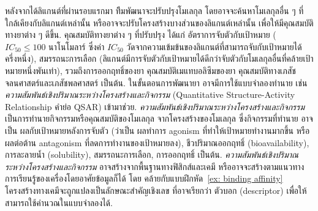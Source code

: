 {\begin{shaded}
หลังจากได้ลิแกนต์ที่ผ่านรอบแรกมา
ทีีมพัฒนาจะปรับปรุงโมเลกุล 
โดยอาจจะค้นหาโมเลกุลอื่น ๆ ที่ใกล้เคียงกับลิแกนต์เหล่านั้น
หรืออาจจะปรับโครงสร้างบางส่วนของลิแกนต์เหล่านั้น
เพื่อให้มีคุณสมบัติทางยาต่าง ๆ ดีขึ้น.
คุณสมบัติทางยาต่าง ๆ ที่ปรับปรุง
ได้แก่ อัตราการจับตัวกับเป้าหมาย ($IC_{50} \leq 100$ นาโนโมลาร์ ซึ่งค่า $IC_{50}$ วัดจากความเข้มข้นของลิแกนต์ที่สามารถจับกับเป้าหมายได้ครึ่งหนึ่ง), %
สมรรถนะการเลือก (ลิแกนต์มีการจับตัวกับเป้าหมายได้ดีกว่าจับตัวกับโมเลกุลอื่นที่คล้ายเป้าหมายหนึ่งพันเท่า),
รวมถึงการออกฤทธิ์ของยา คุณสมบัติเมแทบอลิซึมของยา คุณสมบัติทางเภสัชจลนศาสตร์และเภสัชพลศาสตร์ เป็นต้น.
ในขั้นตอนการพัฒนายา อาจมีการใช้แบบจำลองทำนาย เช่น \textit{ความสัมพันธ์เชิงปริมาณระหว่างโครงสร้างและกิจกรรม} (Quantitative Structure-Activity Relationship\cite{NantasenamatEtAl2009, Mitchell2014} คำย่อ QSAR) เข้ามาช่วย.
\textit{ความสัมพันธ์เชิงปริมาณระหว่างโครงสร้างและกิจกรรม}
เป็นการทำนายกิจกรรมหรือคุณสมบัติของโมเลกุล จากโครงสร้างของโมเลกุล
ซึ่งกิจกรรมที่ทำนาย อาจเป็น
ผลกับเป้าหมายหลังการจับตัว (ว่าเป็น ผลทำการ agonism ที่ทำให้เป้าหมายทำงานมากขึ้น 
หรือผลต่อต้าน antagonism ที่ลดการทำงานของเป้าหมายลง),
ชีวปริมาณออกฤทธิ์ (bioavailability),
การละลายน้ำ (solubility),
สมรรถนะการเลือก, การออกฤทธิ์ เป็นต้น.
\textit{ความสัมพันธ์เชิงปริมาณระหว่างโครงสร้างและกิจกรรม}
อาจสร้างจากพื้นฐานทางฟิสิกส์และเคมี
หรืออาจจะสร้างตามแนวทางการเรียนรู้ของเครื่องโดยอาศัยข้อมูลก็ได้
โดย คล้ายกับแบบฝึกหัด~\ref{ex: binding affinity} 
โครงสร้างทางเคมีจะถูกแปลงเป็นลักษณะสำคัญเชิงเลข ที่อาจเรียกว่า ตัวบอก (descriptor) เพื่อให้สามารถใช้คำนวณในแบบจำลองได้.

%

%
%
%
%


\end{shaded}}
